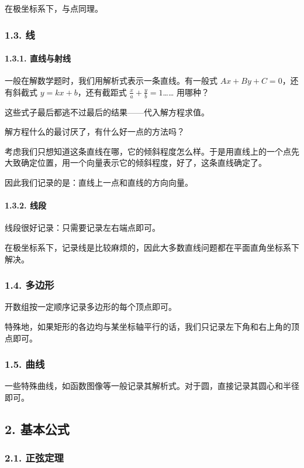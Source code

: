 在极坐标系下，与点同理。

\subsubsection{1.3. 线}

\paragraph{1.3.1. 直线与射线}

一般在解数学题时，我们用解析式表示一条直线。有一般式 $Ax+By+C=0$，还有斜截式 $y=kx+b$，还有截距式 $\frac{x}{a}+\frac{y}{b}=1$…… 用哪种？

这些式子最后都逃不过最后的结果——代入解方程求值。

解方程什么的最讨厌了，有什么好一点的方法吗？

考虑我们只想知道这条直线在哪，它的倾斜程度怎么样。于是用直线上的一个点先大致确定位置，用一个向量表示它的倾斜程度，好了，这条直线确定了。

因此我们记录的是：直线上一点和直线的方向向量。

\paragraph{1.3.2. 线段}

线段很好记录：只需要记录左右端点即可。

在极坐标系下，记录线是比较麻烦的，因此大多数直线问题都在平面直角坐标系下解决。

\subsubsection{1.4. 多边形}

开数组按一定顺序记录多边形的每个顶点即可。

特殊地，如果矩形的各边均与某坐标轴平行的话，我们只记录左下角和右上角的顶点即可。

\subsubsection{1.5. 曲线}

一些特殊曲线，如函数图像等一般记录其解析式。对于圆，直接记录其圆心和半径即可。

\subsection{2. 基本公式}

\subsubsection{2.1. 正弦定理}

